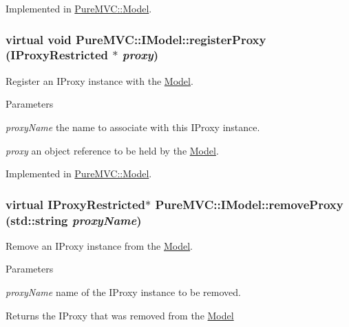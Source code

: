 Implemented in \hyperlink{class_pure_m_v_c_1_1_model_ae25df8e28fb2d4be29b8217211c7d965}{PureMVC::Model}.\hypertarget{class_pure_m_v_c_1_1_i_model_a538f7de97ba62dcce4d0144e88055d0b}{
\subsubsection[{registerProxy}]{\setlength{\rightskip}{0pt plus 5cm}virtual void PureMVC::IModel::registerProxy ({\bf IProxyRestricted} $\ast$ {\em proxy})}}
\label{class_pure_m_v_c_1_1_i_model_a538f7de97ba62dcce4d0144e88055d0b}


Register an {\ttfamily IProxy} instance with the {\ttfamily \hyperlink{class_pure_m_v_c_1_1_model}{Model}}. 
\begin{DoxyParams}{Parameters}
\item[{\em proxyName}]the name to associate with this {\ttfamily IProxy} instance. \item[{\em proxy}]an object reference to be held by the {\ttfamily \hyperlink{class_pure_m_v_c_1_1_model}{Model}}. \end{DoxyParams}


Implemented in \hyperlink{class_pure_m_v_c_1_1_model_a12d22c0faf6aa8c69d7b0e3d3cfdd13b}{PureMVC::Model}.\hypertarget{class_pure_m_v_c_1_1_i_model_a40caa7c04f887dda157125d94267fff9}{
\subsubsection[{removeProxy}]{\setlength{\rightskip}{0pt plus 5cm}virtual {\bf IProxyRestricted}$\ast$ PureMVC::IModel::removeProxy (std::string {\em proxyName})}}
\label{class_pure_m_v_c_1_1_i_model_a40caa7c04f887dda157125d94267fff9}


Remove an {\ttfamily IProxy} instance from the \hyperlink{class_pure_m_v_c_1_1_model}{Model}. 
\begin{DoxyParams}{Parameters}
\item[{\em proxyName}]name of the {\ttfamily IProxy} instance to be removed. \end{DoxyParams}
\begin{DoxyReturn}{Returns}
the {\ttfamily IProxy} that was removed from the {\ttfamily \hyperlink{class_pure_m_v_c_1_1_model}{Model}} 
\end{DoxyReturn}


